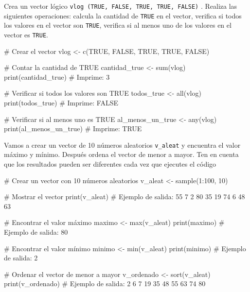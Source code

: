 \documentclass[
  letterpaper,
  DIV=11,
  numbers=noendperiod]{scrreprt}
\newenvironment{Shaded}{\begin{snugshade}}{\end{snugshade}}
\newcommand{\CommentTok}[1]{\textcolor[rgb]{0.37,0.37,0.37}{#1}}
\newcommand{\ConstantTok}[1]{\textcolor[rgb]{0.56,0.35,0.01}{#1}}
\newcommand{\DecValTok}[1]{\textcolor[rgb]{0.68,0.00,0.00}{#1}}
\newcommand{\FunctionTok}[1]{\textcolor[rgb]{0.28,0.35,0.67}{#1}}
\newcommand{\NormalTok}[1]{\textcolor[rgb]{0.00,0.23,0.31}{#1}}
\newcommand{\OtherTok}[1]{\textcolor[rgb]{0.00,0.23,0.31}{#1}}
\newcommand{\SpecialCharTok}[1]{\textcolor[rgb]{0.37,0.37,0.37}{#1}}
\begin{document}
Crea un vector lógico
\texttt{vlog\ (TRUE,\ FALSE,\ TRUE,\ TRUE,\ FALSE)} . Realiza las
siguientes operaciones: calcula la cantidad de \texttt{TRUE} en el
vector, verifica si todos los valores en el vector son \texttt{TRUE},
verifica si al menos uno de los valores en el vector es \texttt{TRUE}.

\begin{Shaded}
\begin{Highlighting}[]
\CommentTok{\# Crear el vector}
\NormalTok{vlog }\OtherTok{\textless{}{-}} \FunctionTok{c}\NormalTok{(}\ConstantTok{TRUE}\NormalTok{, }\ConstantTok{FALSE}\NormalTok{, }\ConstantTok{TRUE}\NormalTok{, }\ConstantTok{TRUE}\NormalTok{, }\ConstantTok{FALSE}\NormalTok{)}

\CommentTok{\# Contar la cantidad de TRUE}
\NormalTok{cantidad\_true }\OtherTok{\textless{}{-}} \FunctionTok{sum}\NormalTok{(vlog)}
\FunctionTok{print}\NormalTok{(cantidad\_true)  }\CommentTok{\# Imprime: 3}

\CommentTok{\# Verificar si todos los valores son TRUE}
\NormalTok{todos\_true }\OtherTok{\textless{}{-}} \FunctionTok{all}\NormalTok{(vlog)}
\FunctionTok{print}\NormalTok{(todos\_true)  }\CommentTok{\# Imprime: FALSE}

\CommentTok{\# Verificar si al menos uno es TRUE}
\NormalTok{al\_menos\_un\_true }\OtherTok{\textless{}{-}} \FunctionTok{any}\NormalTok{(vlog)}
\FunctionTok{print}\NormalTok{(al\_menos\_un\_true)  }\CommentTok{\# Imprime: TRUE}
\end{Highlighting}
\end{Shaded}

Vamos a crear un vector de 10 números aleatorios \texttt{v\_aleat} y
encuentra el valor máximo y mínimo. Después ordena el vector de menor a
mayor. Ten en cuenta que los resultados pueden ser diferentes cada vez
que ejecutes el código

\begin{Shaded}
\begin{Highlighting}[]
\CommentTok{\# Crear un vector con 10 números aleatorios}
\NormalTok{v\_aleat }\OtherTok{\textless{}{-}} \FunctionTok{sample}\NormalTok{(}\DecValTok{1}\SpecialCharTok{:}\DecValTok{100}\NormalTok{, }\DecValTok{10}\NormalTok{)}

\CommentTok{\# Mostrar el vector}
\FunctionTok{print}\NormalTok{(v\_aleat)}
\CommentTok{\# Ejemplo de salida: 55  7  2  80 35 19 74  6 48 63}

\CommentTok{\# Encontrar el valor máximo}
\NormalTok{maximo }\OtherTok{\textless{}{-}} \FunctionTok{max}\NormalTok{(v\_aleat)}
\FunctionTok{print}\NormalTok{(maximo)}
\CommentTok{\# Ejemplo de salida: 80}

\CommentTok{\# Encontrar el valor mínimo}
\NormalTok{minimo }\OtherTok{\textless{}{-}} \FunctionTok{min}\NormalTok{(v\_aleat)}
\FunctionTok{print}\NormalTok{(minimo)}
\CommentTok{\# Ejemplo de salida: 2}

\CommentTok{\# Ordenar el vector de menor a mayor}
\NormalTok{v\_ordenado }\OtherTok{\textless{}{-}} \FunctionTok{sort}\NormalTok{(v\_aleat)}
\FunctionTok{print}\NormalTok{(v\_ordenado)}
\CommentTok{\# Ejemplo de salida: 2  6  7 19 35 48 55 63 74 80}
\end{Highlighting}
\end{Shaded}
\end{document}
